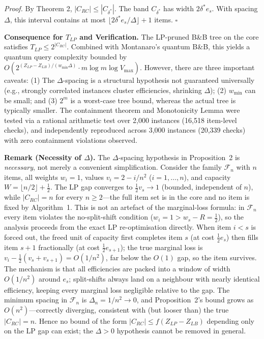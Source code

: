 \documentclass[conference]{IEEEtran} \IEEEoverridecommandlockouts
\begin{document}
\textit{Proof.} By Theorem 2, $|C_{RC}| \le |C_{\delta^*}|$. The band $C_{\delta^*}$ has width $2 \delta^* e_s$. With spacing $\Delta$, this interval contains at most $\lfloor 2\delta^* e_s / \Delta \rfloor + 1$ items. $\square$

\textbf{Consequence for $T_{LP}$ and Verification.} The LP-pruned B\&B tree on the core satisfies $T_{LP} \le 2^{|C_{RC}|}$. Combined with Montanaro's quantum B\&B, this yields a quantum query complexity bounded by $O(2^{(Z_{LP} - Z_{LB})/(w_{\min} \Delta)} \cdot m \log m \log V_{\max})$. However, there are three important caveats: (1) The $\Delta$-spacing is a structural hypothesis not guaranteed universally (e.g., strongly correlated instances cluster efficiencies, shrinking $\Delta$); (2) $w_{\min}$ can be small; and (3) $2^m$ is a worst-case tree bound, whereas the actual tree is typically smaller.
The containment theorem and Monotonicity Lemma were tested via a rational arithmetic test over 2,000 instances (16,518 item-level checks), and independently reproduced across 3,000 instances (20,339 checks) with zero containment violations observed.

\textbf{Remark (Necessity of $\Delta$).} The $\Delta$-spacing hypothesis in Proposition~2 is \emph{necessary}, not merely a convenient simplification. Consider the family $\mathcal{F}_n$ with $n$ items, all weights $w_i = 1$, values $v_i = 2 - i/n^2$ ($i = 1, \ldots, n$), and capacity $W = \lfloor n/2 \rfloor + \tfrac{1}{2}$. The LP gap converges to $\tfrac{1}{2}v_s \to 1$ (bounded, independent of $n$), while $|C_{RC}| = n$ for every $n \ge 2$---the full item set is in the core and no item is fixed by Algorithm~1. This is not an artefact of the marginal-loss formula: in $\mathcal{F}_n$ every item violates the no-split-shift condition ($w_i = 1 > w_s - R = \tfrac{1}{2}$), so the analysis proceeds from the exact LP re-optimisation directly. When item $i < s$ is forced out, the freed unit of capacity first completes item $s$ (at cost $\tfrac{1}{2}e_s$) then fills item $s{+}1$ fractionally (at cost $\tfrac{1}{2}e_{s+1}$); the true marginal loss is $v_i - \tfrac{1}{2}(v_s + v_{s+1}) = O(1/n^2)$, far below the $O(1)$ gap, so the item survives. The mechanism is that all efficiencies are packed into a window of width $O(1/n^2)$ around $e_s$; split-shifts always land on a neighbour with nearly identical efficiency, keeping every marginal loss negligible relative to the gap. The minimum spacing in $\mathcal{F}_n$ is $\Delta_n = 1/n^2 \to 0$, and Proposition~2's bound grows as $O(n^2)$---correctly diverging, consistent with (but looser than) the true $|C_{RC}| = n$. Hence no bound of the form $|C_{RC}| \le f(Z_{LP} - Z_{LB})$ depending only on the LP gap can exist; the $\Delta > 0$ hypothesis cannot be removed in general.
\end{document}
